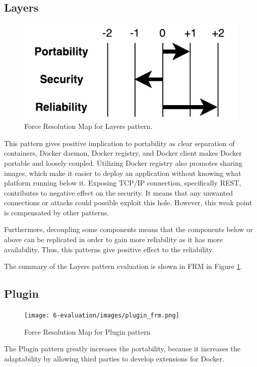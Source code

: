 \subsection{Layers}

\begin{figure}[H]
\centering
\includegraphics[scale=0.7]{6-evaluation/images/layers_frm.pdf}
\caption{Force Resolution Map for Layers pattern.}
\label{fig:layers-frm}
\end{figure}
This pattern gives positive implication to portability as clear separation of
containers, Docker daemon, Docker registry, and Docker client makes Docker
portable and loosely coupled. Utilizing Docker registry also promotes sharing
images, which make it easier to deploy an application without knowing what
platform running below it. Exposing TCP/IP connection, specifically REST,
contributes to negative effect on the security. It means that any unwanted
connections or attacks could possible exploit this hole. However, this weak
point is compensated by other patterns. 

Furthermore, decoupling some components
means that the components below or above can be replicated in order to gain more
reliability as it has more availability. Thus, this patterns give positive
effect to the reliability. 

The summary of the Layers pattern evaluation is shown
in FRM in Figure \ref{fig:layers-frm}.

\subsection{Plugin}
\begin{figure}[H]
\centering
\texttt{[image: 6-evaluation/images/plugin\_frm.png]}
\caption{Force Resolution Map for Plugin pattern}
\label{fig:plugin-frm}
\end{figure}
The Plugin pattern greatly increases the portability, because it increases the adaptability by allowing third parties to develop extensions for Docker. 

